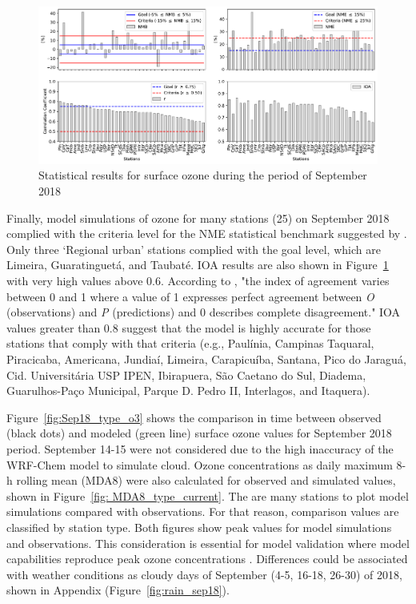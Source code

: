 \begin{figure}[!ht]
\begin{center}
    \includegraphics[width=1\textwidth]{fig/o3_stats.pdf}
\end{center}
  \caption{Statistical results for surface ozone during the period of September 2018}
  \label{fig: o3_stats}
\end{figure}

  Finally, model simulations of ozone for many stations (25) on September 2018 complied with the criteria level for the NME statistical benchmark suggested by \citet{Emery2017}. Only three `Regional urban' stations complied with the goal level, which are Limeira, Guaratinguet\'{a}, and Taubat\'{e}.
  IOA results are also shown in Figure~\ref{fig: o3_stats} with very high values above 0.6.
  According to \citet{Willmott1984}, "the index of agreement varies between 0 and 1 where a value of 1 expresses perfect agreement between \textit{O} (observations) and \textit{P} (predictions) and 0 describes complete disagreement."
  IOA values greater than 0.8 suggest that the model is highly accurate for those stations that comply with that criteria (e.g., Paulínia, Campinas Taquaral, Piracicaba, Americana, Jundiaí, Limeira, Carapicuíba, Santana, Pico do Jaraguá, Cid. Universitária USP IPEN, Ibirapuera, São Caetano do Sul, Diadema, Guarulhos-Paço Municipal, Parque D. Pedro II, Interlagos, and Itaquera).

Figure~\ref{fig:Sep18_type_o3} shows the comparison in time between observed (black dots) and modeled (green line) surface ozone values for September 2018 period.
September 14-15 were not considered due to the high inaccuracy of the WRF-Chem model to simulate cloud.   
Ozone concentrations as daily maximum 8-h rolling mean (MDA8) were also calculated for observed and simulated values, shown in Figure~\ref{fig: MDA8_type_current}.
The are many stations to plot model simulations compared with observations.
For that reason, comparison values are classified by station type.
Both figures show peak values for model simulations and observations.
This consideration is essential for model validation where model capabilities reproduce peak ozone concentrations \citep{Seinfeld2016}.
Differences could be associated with weather conditions as cloudy days of September (4-5, 16-18, 26-30) of 2018, shown in Appendix (Figure~\ref{fig:rain_sep18}).

